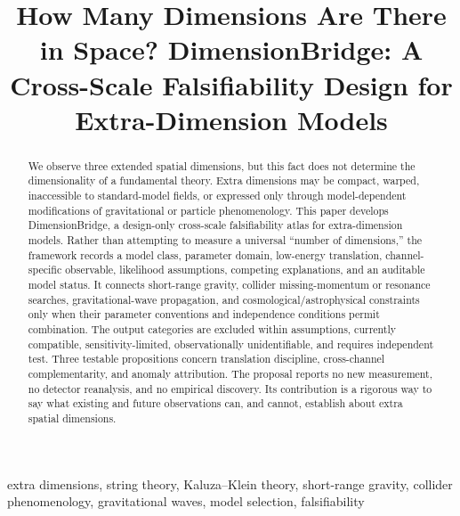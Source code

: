 \documentclass[conference]{IEEEtran}
\begin{document}
\title{How Many Dimensions Are There in Space? DimensionBridge: A Cross-Scale Falsifiability Design for Extra-Dimension Models}

\author{
}

\maketitle

\begin{abstract}
We observe three extended spatial dimensions, but this fact does not determine the dimensionality of a fundamental theory. Extra dimensions may be compact, warped, inaccessible to standard-model fields, or expressed only through model-dependent modifications of gravitational or particle phenomenology. This paper develops DimensionBridge, a design-only cross-scale falsifiability atlas for extra-dimension models. Rather than attempting to measure a universal ``number of dimensions,'' the framework records a model class, parameter domain, low-energy translation, channel-specific observable, likelihood assumptions, competing explanations, and an auditable model status. It connects short-range gravity, collider missing-momentum or resonance searches, gravitational-wave propagation, and cosmological/astrophysical constraints only when their parameter conventions and independence conditions permit combination. The output categories are excluded within assumptions, currently compatible, sensitivity-limited, observationally unidentifiable, and requires independent test. Three testable propositions concern translation discipline, cross-channel complementarity, and anomaly attribution. The proposal reports no new measurement, no detector reanalysis, and no empirical discovery. Its contribution is a rigorous way to say what existing and future observations can, and cannot, establish about extra spatial dimensions.
\end{abstract}

\begin{IEEEkeywords}
extra dimensions, string theory, Kaluza--Klein theory, short-range gravity, collider phenomenology, gravitational waves, model selection, falsifiability
\end{IEEEkeywords}
\end{document}
